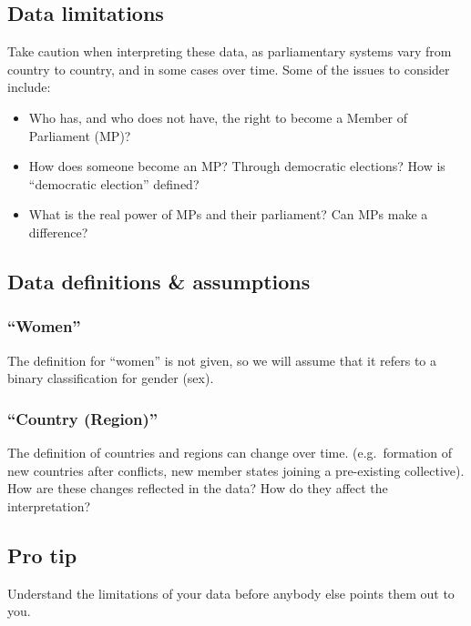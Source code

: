 \documentclass[a4paper,9pt,twocolumn,twoside,printwatermark=true]{pinp}
\providecommand{\tightlist}{%
  \setlength{\itemsep}{0pt}\setlength{\parskip}{0pt}}
\begin{document}
\subsection{Data limitations}\label{data-limitations}

Take caution when interpreting these data, as parliamentary systems vary
from country to country, and in some cases over time. Some of the issues
to consider include:

\begin{itemize}
\tightlist
\item
  Who has, and who does not have, the right to become a Member of
  Parliament (MP)?
\item
  How does someone become an MP? Through democratic elections? How is
  ``democratic election'' defined?
\item
  What is the real power of MPs and their parliament? Can MPs make a
  difference?
\end{itemize}

\subsection{Data definitions \&
assumptions}\label{data-definitions-assumptions}

\subsubsection{\texorpdfstring{``Women''}{Women}}\label{women}

The definition for ``women'' is not given, so we will assume that it
refers to a binary classification for gender (sex).

\subsubsection{\texorpdfstring{``Country
(Region)''}{Country (Region)}}\label{country-region}

The definition of countries and regions can change over time.
(e.g.~formation of new countries after conflicts, new member states
joining a pre-existing collective). How are these changes reflected in
the data? How do they affect the interpretation?

\subsection{Pro tip}\label{pro-tip}

Understand the limitations of your data before anybody else points them
out to you.
\end{document}
